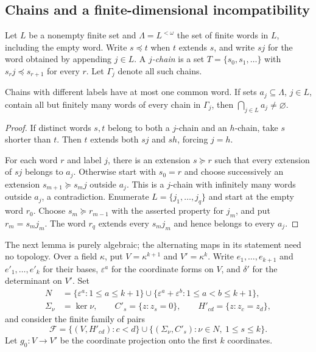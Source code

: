 \subsection{Chains and a finite-dimensional incompatibility}

Let $L$ be a nonempty finite set and $\Lambda=L^{<\omega}$ the set of finite words in $L$, including the
empty word. Write $s\preceq t$ when $t$ extends $s$, and write $sj$ for the word obtained by appending
$j\in L$. A \emph{$j$-chain} is a set $T=\{s_0,s_1,\dots\}$ with $s_rj\preceq s_{r+1}$ for every $r$.
Let $\Gamma_j$ denote all such chains.

\begin{lemma}\label{scalar:gap}
Chains with different labels have at most one common word. If sets $a_j\subseteq\Lambda$, $j\in L$,
contain all but finitely many words of every chain in $\Gamma_j$, then $\bigcap_{j\in L}a_j\ne\varnothing$.
\end{lemma}

\begin{proof}
If distinct words $s,t$ belong to both a $j$-chain and an $h$-chain, take $s$ shorter than $t$.
Then $t$ extends both $sj$ and $sh$, forcing $j=h$.

For each word $r$ and label $j$, there is an extension $s\succeq r$ such that every extension of $sj$
belongs to $a_j$. Otherwise start with $s_0=r$ and choose successively an extension
$s_{m+1}\succeq s_mj$ outside $a_j$. This is a $j$-chain with infinitely many words outside $a_j$,
a contradiction. Enumerate $L=\{j_1,\dots,j_q\}$ and start at the empty word $r_0$. Choose $s_m\succeq
r_{m-1}$ with the asserted property for $j_m$, and put $r_m=s_mj_m$. The word $r_q$ extends every
$s_mj_m$ and hence belongs to every $a_j$.
\end{proof}

The next lemma is purely algebraic; the alternating maps in its statement need no topology.
Over a field $\kappa$, put $V=\kappa^{k+1}$ and $V'=\kappa^k$. Write $e_1,\dots,e_{k+1}$ and
$e'_1,\dots,e'_k$ for their bases, $\varepsilon^a$ for the coordinate forms on $V$, and $\delta'$ for the
determinant on $V'$. Set
\begin{align*}
 N&=\{\varepsilon^a:1\le a\le k+1\}
       \cup\{\varepsilon^a+\varepsilon^b:1\le a<b\le k+1\},\\
 \Sigma_\nu&=\ker\nu,\qquad C'_s=\{z:z_s=0\},\qquad H'_{cd}=\{z:z_c=z_d\},
\end{align*}
and consider the finite family of pairs
\begin{equation}\label{scalar:family}
 \mathcal F=\{(V,H'_{cd}):c<d\}
 \cup\{(\Sigma_\nu,C'_s):\nu\in N,\ 1\le s\le k\}.
\end{equation}
Let $g_0\colon V\to V'$ be the coordinate projection onto the first $k$ coordinates.

